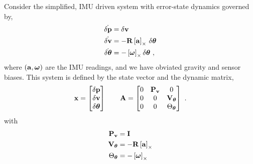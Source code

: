 Consider the simplified, IMU driven system with error-state dynamics governed by,
%
\begin{subequations}
%
\begin{align}
\dot{\delta{\bf p}}   &= \delta{\bf v} \\
\dot{\delta{\bf v}}   &= -{\bf R}\left[{\bf a}\right]_\times\,\delta{\bm \theta} \\
\dot{\delta{\bm \theta}} &= -\left[{\bm \omega}\right]_\times\delta{\bm \theta}~,
\end{align}%
\end{subequations}%
%
where $({\bf a},{\bm \omega})$ are the IMU readings, and we have obviated gravity and sensor biases. 
This system is defined by the state vector and the dynamic matrix,
%
\begin{equation}
{\bf x} = \begin{bmatrix}
\delta{\bf p} \\ \delta{\bf v} \\ \delta{\bm \theta}
\end{bmatrix}
\qquad
{\bf A} = \begin{bmatrix}
0 & {\bf P}_{\bf v} & 0 \\
0 & 0 & {\bf V}_{\bm \theta} \\
0 & 0 & \Theta_{\bm \theta}
\end{bmatrix}~.
\end{equation}
%
with
%
%
\begin{align}
{\bf P}_{\bf v} &= {\bf I} \\
{\bf V}_{\bm \theta} &= -{\bf R}\left[{\bf a}\right]_\times \\
\Theta_{\bm \theta} &= -\left[{\bm \omega}\right]_\times \label{equ:ThetaThetaDef}
\end{align}%


